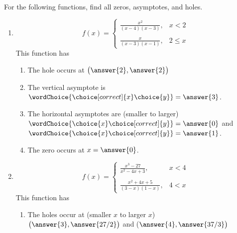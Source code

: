 \documentclass{ximera}
\author{Elizabeth Campolongo}
\begin{document}
\begin{exercise}
For the following functions, find all zeros, asymptotes, and holes. 
%
\begin{enumerate}
%
\item \begin{equation*}
	f(x) = \begin{cases}
		\frac{x^2}{(x-4)(x-3)},  & x <2 \\
		\\
		\frac{x}{(x-3)(x-1)},  & 2 \leq x 
		\end{cases}
		\end{equation*}
This function has
\begin{selectAll}
\end{selectAll}
%
\begin{exercise}
\begin{enumerate}
\item The hole occurs at $\big(\answer{2},\answer{2}\big)$

\item The vertical asymptote is $\wordChoice{\choice[correct]{x}\choice{y}} = \answer{3}$.

\item The horizontal asymptotes are (smaller to larger) \\
$\wordChoice{\choice{x}\choice[correct]{y}} = \answer{0}$ and $\wordChoice{\choice{x}\choice[correct]{y}} =\answer{1}$.

\item The zero occurs at $x=\answer{0}$.
\end{enumerate}
\end{exercise}

\item \begin{equation*}
	f(x) = \begin{cases}
		\frac{x^3-27}{x^2 - 4x+3},  & x < 4 \\
		\\
		\frac{x^2+4x+5}{(3-x)(1-x)},  & 4 < x 
		\end{cases}
		\end{equation*}
This function has
\begin{selectAll}
\end{selectAll}
%
\begin{exercise}
\begin{enumerate}
\item The holes occur at (smaller $x$ to larger $x$) \\
$\big(\answer{3},\answer{27/2}\big)$ and \big($\answer{4},\answer{37/3}\big)$


\end{enumerate}
\end{exercise}
\end{enumerate}
\end{exercise}
\end{document}
